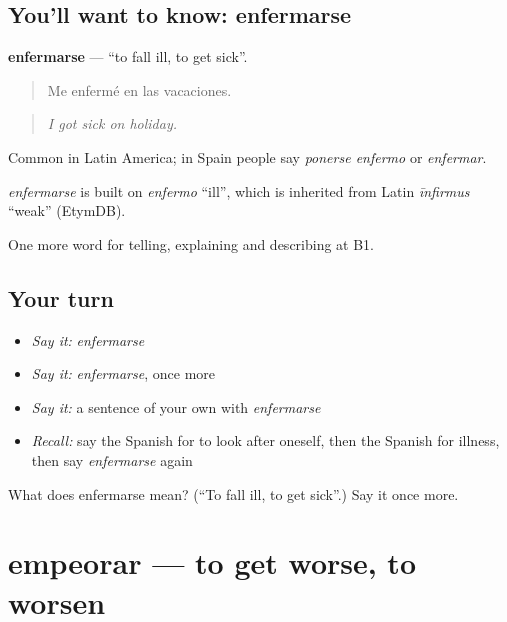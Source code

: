 \subsection*{You'll want to know: enfermarse}
\textbf{enfermarse} — \textquotedblleft{}to fall ill, to get sick\textquotedblright{}.

\begin{quote}
Me enfermé en las vacaciones.
\end{quote}

\begin{quote}
\emph{I got sick on holiday.}
\end{quote}

Common in Latin America; in Spain people say \emph{ponerse enfermo} or \emph{enfermar}.

\begin{cousinweb}
\emph{enfermarse} is built on \emph{enfermo} \textquotedblleft{}ill\textquotedblright{}, which is inherited from Latin \emph{īnfirmus} \textquotedblleft{}weak\textquotedblright{} (EtymDB).
\end{cousinweb}

\begin{grammarlens}[title={What you've built}]
One more word for telling, explaining and describing at B1.
\end{grammarlens}

\subsection*{Your turn}
\begin{itemize}
\raggedright
  \item \emph{Say it:} \emph{enfermarse}
  \item \emph{Say it:} \emph{enfermarse}, once more
  \item \emph{Say it:} a sentence of your own with \emph{enfermarse}
  \item \emph{Recall:} say the Spanish for to look after oneself, then the Spanish for illness, then say \emph{enfermarse} again
\end{itemize}

\begin{tcolorbox}[breakable,colback=teal!4,colframe=teal!35!black,title={Before you move on}]
What does enfermarse mean? (\textquotedblleft{}To fall ill, to get sick\textquotedblright{}.) Say it once more.
\end{tcolorbox}
\section[empeorar]{empeorar — to get worse, to worsen}

